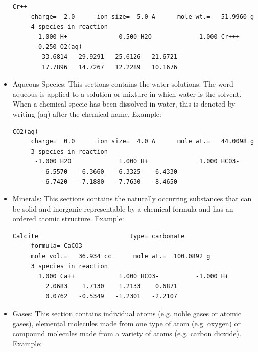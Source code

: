 \begin{itemize}
\begin{minipage}[c]{0.92\textwidth}
\begin{lstlisting}[frame=single, caption=Excerpt of the section Redox Couples]
Cr++
     charge=  2.0      ion size=  5.0 A      mole wt.=   51.9960 g
     4 species in reaction
      -1.000 H+              0.500 H2O             1.000 Cr+++
      -0.250 O2(aq)
        33.6814   29.9291   25.6126   21.6721
        17.7896   14.7267   12.2289   10.1676
\end{lstlisting}
\end{minipage}

\item Aqueous Species: This sections contains the water solutions. The word aqueous is applied to a solution or mixture in which water is the solvent. When a chemical specie has been dissolved in water, this is denoted by writing (aq) after the chemical name. Example:

\begin{minipage}[c]{0.92\textwidth}
\begin{lstlisting}[frame=single, caption=Excerpt of the section Aqueous Species]
CO2(aq)
     charge=  0.0      ion size=  4.0 A      mole wt.=   44.0098 g
     3 species in reaction
      -1.000 H2O             1.000 H+              1.000 HCO3-
        -6.5570   -6.3660   -6.3325   -6.4330
        -6.7420   -7.1880   -7.7630   -8.4650
\end{lstlisting}
\end{minipage}

\item Minerals: This sections contains the naturally occurring substances that can be solid and inorganic representable by a chemical formula and has an ordered atomic structure. Example: 

\begin{minipage}[c]{0.92\textwidth}
\begin{lstlisting}[frame=single, caption=Excerpt of the section Minerals]
Calcite                         type= carbonate
     formula= CaCO3
     mole vol.=   36.934 cc      mole wt.=  100.0892 g
     3 species in reaction
       1.000 Ca++            1.000 HCO3-          -1.000 H+
         2.0683    1.7130    1.2133    0.6871
         0.0762   -0.5349   -1.2301   -2.2107
\end{lstlisting}
\end{minipage}

\item Gases: This section contains individual atoms (e.g. noble gases or atomic gases), elemental molecules made from one type of atom (e.g. oxygen) or compound molecules made from a variety of atoms (e.g. carbon dioxide). Example: 


\end{itemize}
